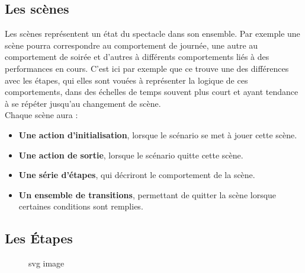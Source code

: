 \subsection{Les scènes}
Les scènes représentent un état du spectacle dans son ensemble. Par exemple une scène pourra correspondre au comportement de journée, une autre au comportement de soirée et d'autres à différents comportements liés à des performances en cours. C'est ici par exemple que ce trouve une des différences avec les étapes, qui elles sont vouées à représenter la logique de ces comportements, dans des échelles de temps souvent plus court et ayant tendance à se répéter jusqu'au changement de scène.\\
Chaque scène aura :
\begin{itemize}
\item \textbf{Une action d'initialisation}, lorsque le scénario se met à jouer cette scène.
\item \textbf{Une action de sortie}, lorsque le scénario quitte cette scène.
\item \textbf{Une série d'étapes}, qui décriront le comportement de la scène.
\item \textbf{Un ensemble de transitions}, permettant de quitter la scène lorsque certaines conditions sont remplies.
\end{itemize}

\subsection{Les Étapes}
\begin{figure}[htbp]
  \centering
  
  \caption{svg image}
\end{figure}



